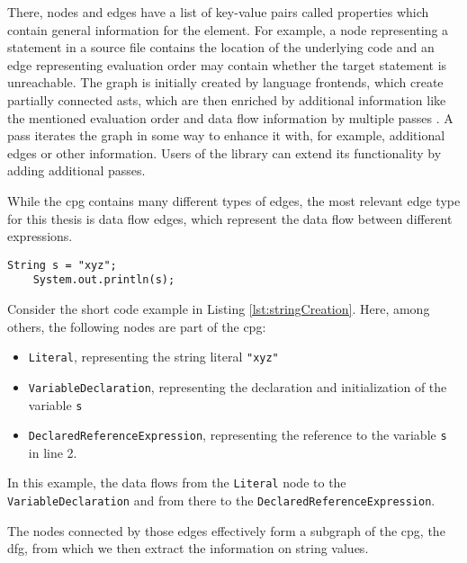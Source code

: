 There, nodes and edges have a list of key-value pairs called properties which contain general information for the element. For example, a node representing a statement in a source file contains the location of the underlying code and an edge representing evaluation order may contain whether the target statement is unreachable. The graph is initially created by language frontends, which create partially connected \acp{ast}, which are then enriched by additional information like the mentioned evaluation order and data flow information by multiple passes \cite{cpg}. A pass iterates the graph in some way to enhance it with, for example, additional edges or other information.
Users of the library can extend its functionality by adding additional passes.

While the \ac{cpg} contains many different types of edges, the most relevant edge type for this thesis is data flow edges, which represent the data flow between different expressions.

\begin{lstlisting}[label={lst:stringCreation}, caption={\ac{cpg} example code}, captionpos=b, numbers=right]
	String s = "xyz";
	System.out.println(s);
\end{lstlisting}

Consider the short code example in Listing \ref{lst:stringCreation}. Here, among others, the following nodes are part of the \ac{cpg}:

\begin{itemize}
	\item \lstinline|Literal|, representing the string literal \lstinline{"xyz"}
	\item \lstinline|VariableDeclaration|, representing the declaration and initialization of the variable \lstinline|s|
	\item \lstinline|DeclaredReferenceExpression|, representing the reference to the variable \lstinline|s| in line 2.
\end{itemize}

In this example, the data flows from the \lstinline|Literal| node to the \lstinline|VariableDeclaration| and from there to the \lstinline|DeclaredReferenceExpression|.

The nodes connected by those edges effectively form a subgraph of the \ac{cpg}, the \ac{dfg}, from which we then extract the information on string values.


